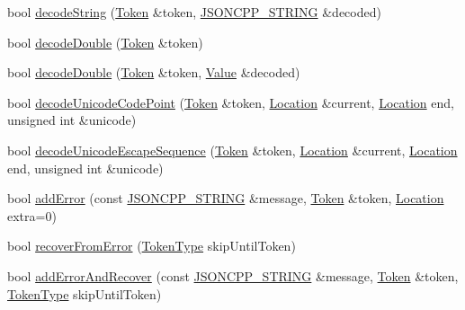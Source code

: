 \begin{DoxyCompactItemize}
\item 
bool \hyperlink{class_json_1_1_reader_a8911a3225ee94d86d83edc2f8c1befe0}{decode\+String} (\hyperlink{class_json_1_1_reader_1_1_token}{Token} \&token, \hyperlink{json_8h_a1e723f95759de062585bc4a8fd3fa4be}{J\+S\+O\+N\+C\+P\+P\+\_\+\+S\+T\+R\+I\+NG} \&decoded)
\item 
bool \hyperlink{class_json_1_1_reader_a2420bbb7fd6d5d3e7e2fea894dd8f70f}{decode\+Double} (\hyperlink{class_json_1_1_reader_1_1_token}{Token} \&token)
\item 
bool \hyperlink{class_json_1_1_reader_a5e4a66be7c413bca86078f14df5eb802}{decode\+Double} (\hyperlink{class_json_1_1_reader_1_1_token}{Token} \&token, \hyperlink{class_json_1_1_value}{Value} \&decoded)
\item 
bool \hyperlink{class_json_1_1_reader_a8fe24db3e9953aef3d637a56447e795c}{decode\+Unicode\+Code\+Point} (\hyperlink{class_json_1_1_reader_1_1_token}{Token} \&token, \hyperlink{class_json_1_1_reader_a46795b5b272bf79a7730e406cb96375a}{Location} \&current, \hyperlink{class_json_1_1_reader_a46795b5b272bf79a7730e406cb96375a}{Location} end, unsigned int \&unicode)
\item 
bool \hyperlink{class_json_1_1_reader_a469cb6f55971d7c41fca2752a3aa5bf7}{decode\+Unicode\+Escape\+Sequence} (\hyperlink{class_json_1_1_reader_1_1_token}{Token} \&token, \hyperlink{class_json_1_1_reader_a46795b5b272bf79a7730e406cb96375a}{Location} \&current, \hyperlink{class_json_1_1_reader_a46795b5b272bf79a7730e406cb96375a}{Location} end, unsigned int \&unicode)
\item 
bool \hyperlink{class_json_1_1_reader_af02176a1d2786b4415bbb00a1b10bb6b}{add\+Error} (const \hyperlink{json_8h_a1e723f95759de062585bc4a8fd3fa4be}{J\+S\+O\+N\+C\+P\+P\+\_\+\+S\+T\+R\+I\+NG} \&message, \hyperlink{class_json_1_1_reader_1_1_token}{Token} \&token, \hyperlink{class_json_1_1_reader_a46795b5b272bf79a7730e406cb96375a}{Location} extra=0)
\item 
bool \hyperlink{class_json_1_1_reader_a8d4ed03a43082c5ace81ba5b81425eaf}{recover\+From\+Error} (\hyperlink{class_json_1_1_reader_aa35e6ab574dc399a0a645ad98ed66bc9}{Token\+Type} skip\+Until\+Token)
\item 
bool \hyperlink{class_json_1_1_reader_a478db8ac6d00db1409608a37b66bc38d}{add\+Error\+And\+Recover} (const \hyperlink{json_8h_a1e723f95759de062585bc4a8fd3fa4be}{J\+S\+O\+N\+C\+P\+P\+\_\+\+S\+T\+R\+I\+NG} \&message, \hyperlink{class_json_1_1_reader_1_1_token}{Token} \&token, \hyperlink{class_json_1_1_reader_aa35e6ab574dc399a0a645ad98ed66bc9}{Token\+Type} skip\+Until\+Token)

\end{DoxyCompactItemize}
